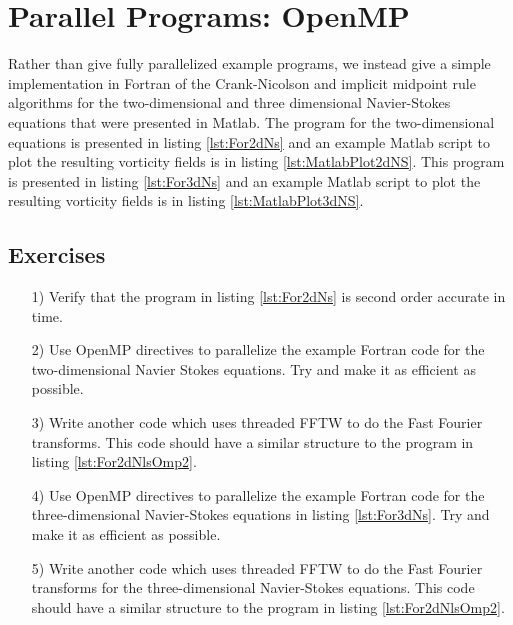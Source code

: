 \section{Parallel Programs: OpenMP}

Rather than give fully parallelized example programs, we instead give a simple implementation in Fortran of the Crank-Nicolson  and implicit midpoint rule algorithms for the two-dimensional and three dimensional Navier-Stokes equations that were presented in Matlab. The program for the two-dimensional equations is presented in listing \ref{lst:For2dNs} and an example Matlab script to plot the resulting vorticity fields is in listing \ref{lst:MatlabPlot2dNS}. This program is presented in listing \ref{lst:For3dNs} and an example Matlab script to plot the resulting vorticity fields is in listing \ref{lst:MatlabPlot3dNS}.









\subsection{Exercises}
\begin{enumerate}
\item[1)] Verify that the program in listing \ref{lst:For2dNs} is second order accurate in time.
\item[2)] Use OpenMP directives to parallelize the example Fortran code for the two-dimensional Navier Stokes equations. Try and make it as efficient as possible.
\item[3)] Write another code which uses threaded FFTW to do the Fast Fourier transforms. This code should have a similar structure to the program in listing \ref{lst:For2dNlsOmp2}. 
\item[4)] Use OpenMP directives to parallelize the example Fortran code for the three-dimensional Navier-Stokes equations in listing \ref{lst:For3dNs}. Try and make it as efficient as possible.
\item[5)] Write another code which uses threaded FFTW to do the Fast Fourier transforms for the three-dimensional Navier-Stokes equations. This code should have a similar structure to the program in listing \ref{lst:For2dNlsOmp2}. 
\end{enumerate}
